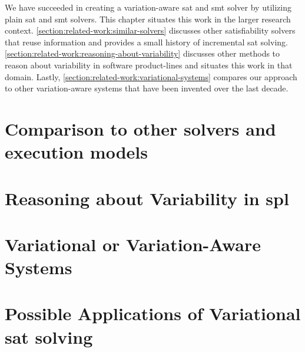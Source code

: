 \label{chapter:related-work}
%
We have succeeded in creating a variation-aware \ac{sat} and \ac{smt} solver by
utilizing plain \ac{sat} and \ac{smt} solvers. This chapter situates this work
in the larger research context. \autoref{section:related-work:similar-solvers}
discusses other satisfiability solvers that reuse information and provides a
small history of incremental \ac{sat} solving.
\autoref{section:related-work:reasoning-about-variability} discusses other
methods to reason about variability in software product-lines and situates this
work in that domain. Lastly, \autoref{section:related-work:variational-systems}
compares our approach to other variation-aware systems that have been invented
over the last decade.
%
\section{Comparison to other solvers and execution models}

%
\section{Reasoning about Variability in \ac{spl}}

%
\section{Variational or Variation-Aware Systems}

%
\section{Possible Applications of Variational \acs{sat} solving}


